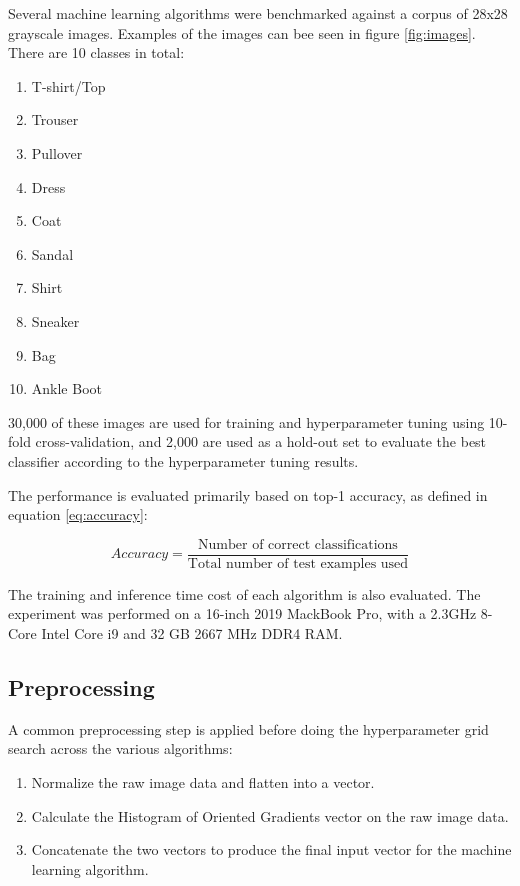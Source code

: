 \documentclass[landscape,twocolumn]{article}
\begin{document}
Several machine learning algorithms were benchmarked against a corpus of 28x28 grayscale images. Examples of the images can bee seen in figure \ref{fig:images}. There are 10 classes in total:
\begin{enumerate}
\item T-shirt/Top
\item Trouser
\item Pullover
\item Dress
\item Coat
\item Sandal
\item Shirt
\item Sneaker
\item Bag
\item Ankle Boot
\end{enumerate}

30,000 of these images are used for training and hyperparameter tuning using 10-fold cross-validation, and 2,000 are used as a hold-out set to evaluate the best classifier according to the hyperparameter tuning results.

The performance is evaluated primarily based on top-1 accuracy, as defined in equation \ref{eq:accuracy}:

\begin{equation}
\label{eq:accuracy}
Accuracy = \frac{\text{Number of correct classifications}}{\text{Total number of test examples used}}
\end{equation}

The training and inference time cost of each algorithm is also evaluated. The experiment was performed on a 16-inch 2019 MackBook Pro, with a 2.3GHz 8-Core Intel Core i9 and 32 GB 2667 MHz DDR4 RAM.

\subsection{Preprocessing}
A common preprocessing step is applied before doing the hyperparameter grid search across the various algorithms:
\begin{enumerate}
\item Normalize the raw image data and flatten into a vector.
\item Calculate the Histogram of Oriented Gradients vector on the raw image data.
\item Concatenate the two vectors to produce the final input vector for the machine learning algorithm.
\end{enumerate}
\end{document}
